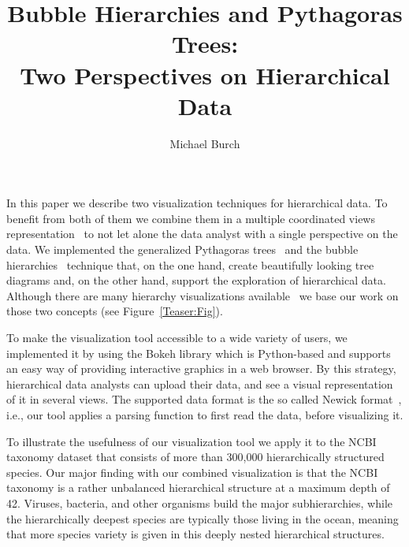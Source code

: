 \documentclass[journal]{vgtc}                %
\title{Bubble Hierarchies and Pythagoras Trees:\\Two Perspectives on Hierarchical Data}
\author{Michael Burch}
\begin{document}


\maketitle

In this paper we describe two visualization techniques for hierarchical data. To benefit from both of them we combine them in a multiple coordinated views representation~\cite{Roberts:07} to not let alone the data analyst with a single perspective on the data. We implemented the generalized Pythagoras trees~\cite{Beck:14,Beck_IVAPP:14} and the bubble hierarchies~\cite{Hlawatsch:14} technique that, on the one hand, create beautifully looking tree diagrams and, on the other hand, support the exploration of hierarchical data. Although there are many hierarchy visualizations available~\cite{Schulz:11,Schulz_CGA:11} we base our work on those two concepts (see Figure~\ref{Teaser:Fig}).

To make the visualization tool accessible to a wide variety of users, we implemented it by using the Bokeh library which is Python-based and supports an easy way of providing interactive graphics in a web browser. By this strategy, hierarchical data analysts can upload their data, and see a visual representation of it in several views. The supported data format is the so called Newick format~\cite{Junier:09}, i.e., our tool applies a parsing function to first read the data, before visualizing it. 

To illustrate the usefulness of our visualization tool we apply it to the NCBI taxonomy dataset that consists of more than 300,000 hierarchically structured species. Our major finding with our combined visualization is that the NCBI taxonomy is a rather unbalanced hierarchical structure at a maximum depth of 42. Viruses, bacteria, and other organisms build the major subhierarchies, while the hierarchically deepest species are typically those living in the ocean, meaning that more species variety is given in this deeply nested hierarchical structures.
\end{document}

